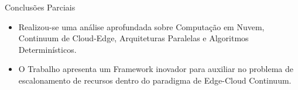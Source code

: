 \begin{frame}{Conclusões Parciais}
    \begin{itemize}
        \item Realizou-se uma análise aprofundada sobre Computação em Nuvem, Continuum de Cloud-Edge, Arquiteturas Paralelas e Algoritmos Determinísticos.
        \item O Trabalho apresenta um Framework inovador para auxiliar no problema de escalonamento de recursos dentro do paradigma de Edge-Cloud Continuum.
    \end{itemize}
\end{frame}